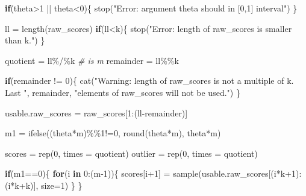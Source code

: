 \documentclass[
]{article}
\newenvironment{Shaded}{\begin{snugshade}}{\end{snugshade}}
\newcommand{\AttributeTok}[1]{\textcolor[rgb]{0.77,0.63,0.00}{#1}}
\newcommand{\CommentTok}[1]{\textcolor[rgb]{0.56,0.35,0.01}{\textit{#1}}}
\newcommand{\ControlFlowTok}[1]{\textcolor[rgb]{0.13,0.29,0.53}{\textbf{#1}}}
\newcommand{\DecValTok}[1]{\textcolor[rgb]{0.00,0.00,0.81}{#1}}
\newcommand{\FunctionTok}[1]{\textcolor[rgb]{0.00,0.00,0.00}{#1}}
\newcommand{\NormalTok}[1]{#1}
\newcommand{\OtherTok}[1]{\textcolor[rgb]{0.56,0.35,0.01}{#1}}
\newcommand{\SpecialCharTok}[1]{\textcolor[rgb]{0.00,0.00,0.00}{#1}}
\newcommand{\StringTok}[1]{\textcolor[rgb]{0.31,0.60,0.02}{#1}}
\begin{document}
\begin{Shaded}
\begin{Highlighting}[]
  \ControlFlowTok{if}\NormalTok{(theta}\SpecialCharTok{\textgreater{}}\DecValTok{1} \SpecialCharTok{||}\NormalTok{ theta}\SpecialCharTok{\textless{}}\DecValTok{0}\NormalTok{)\{}
    \FunctionTok{stop}\NormalTok{(}\StringTok{"Error: argument theta should in [0,1] interval"}\NormalTok{)}
\NormalTok{  \}}

\NormalTok{  ll }\OtherTok{=} \FunctionTok{length}\NormalTok{(raw\_scores)}
  \ControlFlowTok{if}\NormalTok{(ll}\SpecialCharTok{\textless{}}\NormalTok{k)\{}
    \FunctionTok{stop}\NormalTok{(}\StringTok{"Error: length of raw\_scores is smaller than k."}\NormalTok{)}
\NormalTok{  \}}

\NormalTok{  quotient }\OtherTok{=}\NormalTok{ ll}\SpecialCharTok{\%/\%}\NormalTok{k }\CommentTok{\# is m}
\NormalTok{  remainder }\OtherTok{=}\NormalTok{ ll}\SpecialCharTok{\%\%}\NormalTok{k}

  \ControlFlowTok{if}\NormalTok{(remainder }\SpecialCharTok{!=} \DecValTok{0}\NormalTok{)\{}
    \FunctionTok{cat}\NormalTok{(}\StringTok{"Warning: length of raw\_scores is not a multiple of k. Last "}\NormalTok{,}
\NormalTok{        remainder, }\StringTok{"elements of raw\_scores will not be used."}\NormalTok{)}
\NormalTok{  \}}

\NormalTok{  usable.raw\_scores }\OtherTok{=}\NormalTok{ raw\_scores[}\DecValTok{1}\SpecialCharTok{:}\NormalTok{(ll}\SpecialCharTok{{-}}\NormalTok{remainder)]}

\NormalTok{  m1 }\OtherTok{=} \FunctionTok{ifelse}\NormalTok{((theta}\SpecialCharTok{*}\NormalTok{m)}\SpecialCharTok{\%\%}\DecValTok{1}\SpecialCharTok{!=}\DecValTok{0}\NormalTok{, }\FunctionTok{round}\NormalTok{(theta}\SpecialCharTok{*}\NormalTok{m), theta}\SpecialCharTok{*}\NormalTok{m)}

\NormalTok{  scores }\OtherTok{=} \FunctionTok{rep}\NormalTok{(}\DecValTok{0}\NormalTok{, }\AttributeTok{times =}\NormalTok{ quotient)}
\NormalTok{  outlier }\OtherTok{=} \FunctionTok{rep}\NormalTok{(}\DecValTok{0}\NormalTok{, }\AttributeTok{times =}\NormalTok{ quotient)}
  
  \ControlFlowTok{if}\NormalTok{(m1}\SpecialCharTok{==}\DecValTok{0}\NormalTok{)\{}
    \ControlFlowTok{for}\NormalTok{(i }\ControlFlowTok{in} \DecValTok{0}\SpecialCharTok{:}\NormalTok{(m}\DecValTok{{-}1}\NormalTok{))\{}
\NormalTok{      scores[i}\SpecialCharTok{+}\DecValTok{1}\NormalTok{] }\OtherTok{=} \FunctionTok{sample}\NormalTok{(usable.raw\_scores[(i}\SpecialCharTok{*}\NormalTok{k}\SpecialCharTok{+}\DecValTok{1}\NormalTok{)}\SpecialCharTok{:}\NormalTok{(i}\SpecialCharTok{*}\NormalTok{k}\SpecialCharTok{+}\NormalTok{k)], }\AttributeTok{size=}\DecValTok{1}\NormalTok{)}
\NormalTok{    \}}
\NormalTok{  \}}
  

\end{Highlighting}
\end{Shaded}
\end{document}
